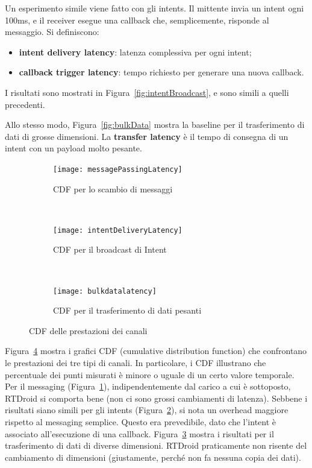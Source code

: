 Un esperimento simile viene fatto con gli intents. Il mittente invia un intent ogni 100ms, e il receiver esegue una callback che, semplicemente, risponde al messaggio. Si definiscono:
\begin{itemize}
	\item \textbf{intent delivery latency}: latenza complessiva per ogni intent;
	\item \textbf{callback trigger latency}: tempo richiesto per generare una nuova callback.
\end{itemize}
I risultati sono mostrati in Figura~\ref{fig:intentBroadcast}, e sono simili a quelli precedenti.

Allo stesso modo, Figura~\ref{fig:bulkData} mostra la baseline per il trasferimento di dati di grosse dimensioni. La \textbf{transfer latency} è il tempo di consegna di un intent con un payload molto pesante.

\begin{figure}[h]
	\centering
	\begin{subfigure}[b]{0.3\textwidth}
		\texttt{[image: messagePassingLatency]}
		\caption{CDF per lo scambio di messaggi}
		\label{fig:messagePassingLatency}
	\end{subfigure}
	~ 
	\begin{subfigure}[b]{0.3\textwidth}
		\texttt{[image: intentDeliveryLatency]}
		\caption{CDF per il broadcast di Intent}
		\label{fig:intentDeliveryLatency}
	\end{subfigure}
	~
	\begin{subfigure}[b]{0.3\textwidth}
		\texttt{[image: bulkdatalatency]}
		\caption{CDF per il trasferimento di dati pesanti}
		\label{fig:bulkdatalatency}
	\end{subfigure}
	\caption{CDF delle prestazioni dei canali}\label{fig:cdfchannels}
\end{figure}

Figura~\ref{fig:cdfchannels} mostra i grafici CDF (cumulative distribution function) che confrontano le prestazioni dei tre tipi di canali. In particolare, i CDF illustrano che percentuale dei punti misurati è minore o uguale di un certo valore temporale. Per il messaging (Figura~\ref{fig:messagePassingLatency}), indipendentemente dal carico a cui è sottoposto, RTDroid si comporta bene (non ci sono grossi cambiamenti di latenza). Sebbene i risultati siano simili per gli intents (Figura~\ref{fig:intentDeliveryLatency}), si nota un overhead maggiore rispetto al messaging semplice. Questo era prevedibile, dato che l'intent è associato all'esecuzione di una callback. Figura~\ref{fig:bulkdatalatency} mostra i risultati per il trasferimento di dati di diverse dimensioni. RTDroid praticamente non risente del cambiamento di dimensioni (giustamente, perché non fa nessuna copia dei dati).


